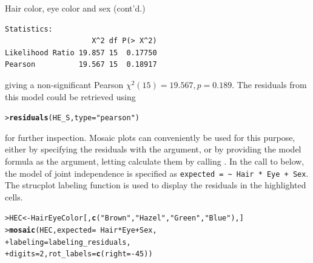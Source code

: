 \documentclass[10pt,krantz2]{krantz}\usepackage[]{graphicx}\usepackage[]{color}
\makeatletter
\newcommand{\hlnum}[1]{\textcolor[rgb]{0.686,0.059,0.569}{#1}}%
\newcommand{\hlstr}[1]{\textcolor[rgb]{0.192,0.494,0.8}{#1}}%
\newcommand{\hlopt}[1]{\textcolor[rgb]{0,0,0}{#1}}%
\newcommand{\hlstd}[1]{\textcolor[rgb]{0.345,0.345,0.345}{#1}}%
\newcommand{\hlkwb}[1]{\textcolor[rgb]{0.69,0.353,0.396}{#1}}%
\newcommand{\hlkwc}[1]{\textcolor[rgb]{0.333,0.667,0.333}{#1}}%
\newcommand{\hlkwd}[1]{\textcolor[rgb]{0.737,0.353,0.396}{\textbf{#1}}}%
\newenvironment{kframe}{%
 \def\at@end@of@kframe{}%
 \ifinner\ifhmode%
  \def\at@end@of@kframe{\end{minipage}}%
  \begin{minipage}{\columnwidth}%
 \fi\fi%
 \def\FrameCommand##1{\hskip\@totalleftmargin \hskip-\fboxsep
 \colorbox{shadecolor}{##1}\hskip-\fboxsep
     \hskip-\linewidth \hskip-\@totalleftmargin \hskip\columnwidth}%
 \MakeFramed {\advance\hsize-\width
   \@totalleftmargin\z@ \linewidth\hsize
   \@setminipage}}%
 {\par\unskip\endMakeFramed%
 \at@end@of@kframe}
\newenvironment{knitrout}{}{} %
\renewenvironment{knitrout}{\small\renewcommand{\baselinestretch}{.85}}{} %
\makeatother
\begin{document}
\begin{Example}[HEC2]{Hair color, eye color and sex (cont'd.)}
\begin{knitrout}
\begin{kframe}
\begin{verbatim}
Statistics:
                    X^2 df P(> X^2)
Likelihood Ratio 19.857 15  0.17750
Pearson          19.567 15  0.18917
\end{verbatim}
\end{kframe}
\end{knitrout}
giving a non-significant Pearson $\chi^2 (15) = 19.567, p=0.189$. 
The residuals from this model could be retrieved using
\begin{knitrout}
\color{fgcolor}\begin{kframe}
\begin{alltt}
\hlstd{> }\hlkwd{residuals}\hlstd{(HE_S,} \hlkwc{type} \hlstd{=} \hlstr{"pearson"}\hlstd{)}
\end{alltt}
\end{kframe}
\end{knitrout}
for further inspection. Mosaic plots can conveniently be used for this
purpose, either by specifying the residuals with the 
argument, or by providing the  model formula as the
 argument, letting  calculate them by
calling .
In the call to  below, the model of joint independence
is specified as \verb|expected = ~ Hair * Eye + Sex|.
The strucplot labeling function 
is used to display the residuals in the highlighted cells.
\begin{knitrout}
\color{fgcolor}\begin{kframe}
\begin{alltt}
\hlstd{> }\hlstd{HEC} \hlkwb{<-} \hlstd{HairEyeColor[,} \hlkwd{c}\hlstd{(}\hlstr{"Brown"}\hlstd{,} \hlstr{"Hazel"}\hlstd{,} \hlstr{"Green"}\hlstd{,} \hlstr{"Blue"}\hlstd{),]}
\hlstd{> }\hlkwd{mosaic}\hlstd{(HEC,} \hlkwc{expected} \hlstd{=} \hlopt{~} \hlstd{Hair} \hlopt{*} \hlstd{Eye} \hlopt{+} \hlstd{Sex,}
\hlstd{+ }       \hlkwc{labeling} \hlstd{= labeling_residuals,}
\hlstd{+ }       \hlkwc{digits} \hlstd{=} \hlnum{2}\hlstd{,} \hlkwc{rot_labels} \hlstd{=} \hlkwd{c}\hlstd{(}\hlkwc{right} \hlstd{=} \hlopt{-}\hlnum{45}\hlstd{))}
\end{alltt}
\end{kframe}\begin{figure}[!htb]


\end{figure}
\end{knitrout}
\end{Example}
\end{document}

